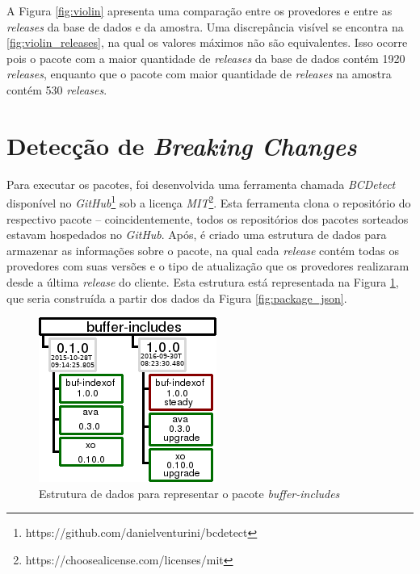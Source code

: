 A Figura \ref{fig:violin} apresenta uma comparação entre os provedores e entre as \textit{releases} da base de dados e da amostra. Uma discrepância visível se encontra na \ref{fig:violin_releases}, na qual os valores máximos não são equivalentes. Isso ocorre pois o pacote com a maior quantidade de \textit{releases} da base de dados contém 1920 \textit{releases}, enquanto que o pacote com maior quantidade de \textit{releases} na amostra contém 530 \textit{releases}.

\section{Detecção de \textit{Breaking Changes}}
\label{sec:bcdetect}
Para executar os pacotes, foi desenvolvida uma ferramenta chamada \textit{BCDetect} disponível no \textit{GitHub}\footnote{https://github.com/danielventurini/bcdetect} sob a licença \textit{MIT}\footnote{https://choosealicense.com/licenses/mit}. Esta ferramenta clona o repositório do respectivo pacote -- coincidentemente, todos os repositórios dos pacotes sorteados estavam hospedados no \textit{GitHub}. Após, é criado uma estrutura de dados para armazenar as informações sobre o pacote, na qual cada \textit{release} contém todas os provedores com suas versões e o tipo de atualização que os provedores realizaram desde a última \textit{release} do cliente. Esta estrutura está representada na Figura \ref{fig:bc_work}, que seria construída a partir dos dados da Figura \ref{fig:package_json}.

\begin{figure}
    \centering
    \includegraphics[scale=2]{figuras/bcdetect_work.png}
    \caption{Estrutura de dados para representar o pacote \textit{buffer-includes}}
    \label{fig:bc_work}
\end{figure}{}

